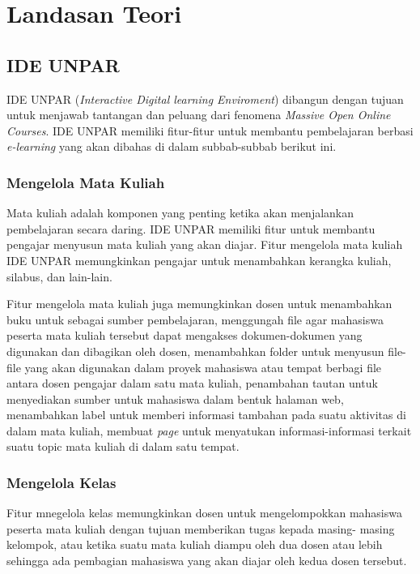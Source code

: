 \chapter{Landasan Teori}
\label{chap:teori}

\section{IDE UNPAR}
\label{sec:IDE UNPAR} 

IDE UNPAR (\textit{Interactive Digital learning Enviroment}) dibangun dengan tujuan untuk menjawab tantangan dan peluang dari fenomena \textit{Massive Open Online Courses}\cite{IDE:dasar-dasar}. IDE UNPAR memiliki fitur-fitur untuk membantu pembelajaran berbasi \textit{e-learning} yang akan dibahas di dalam subbab-subbab berikut ini.

\subsection{Mengelola Mata Kuliah}
Mata kuliah adalah komponen yang penting ketika akan menjalankan pembelajaran secara daring. IDE UNPAR memiliki fitur untuk membantu pengajar menyusun mata kuliah yang akan diajar.  Fitur mengelola mata kuliah IDE UNPAR memungkinkan pengajar untuk menambahkan kerangka kuliah, silabus, dan lain-lain.

Fitur mengelola mata kuliah juga memungkinkan dosen untuk menambahkan buku untuk sebagai sumber pembelajaran, menggungah file agar mahasiswa peserta mata kuliah tersebut dapat mengakses dokumen-dokumen yang digunakan dan dibagikan oleh dosen, menambahkan folder untuk menyusun file-file yang akan digunakan dalam proyek mahasiswa atau tempat berbagi file antara dosen pengajar dalam satu mata kuliah, penambahan tautan untuk menyediakan sumber untuk mahasiswa dalam bentuk halaman web, menambahkan label untuk memberi informasi tambahan pada suatu aktivitas di dalam mata kuliah, membuat \textit{page} untuk menyatukan informasi-informasi terkait suatu topic mata kuliah di dalam satu tempat.

\subsection{Mengelola Kelas} 
Fitur mnegelola kelas memungkinkan dosen untuk mengelompokkan mahasiswa peserta mata kuliah dengan tujuan memberikan tugas kepada masing- masing kelompok, atau ketika suatu mata kuliah diampu oleh dua dosen atau lebih sehingga ada pembagian mahasiswa yang akan diajar oleh kedua dosen tersebut.

